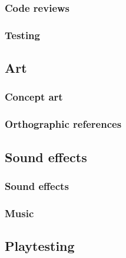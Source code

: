 \documentclass{article}[10pt]
\begin{document}
\subsubsection{Code reviews}
\subsubsection{Testing}

\subsection{Art}
\subsubsection{Concept art}
\paragraph{}
\subsubsection{Orthographic references}
\paragraph{}

\subsection{Sound effects}
\subsubsection{Sound effects}
\paragraph{}
\subsubsection{Music}
\paragraph{}

\subsection{Playtesting}
\end{document}

